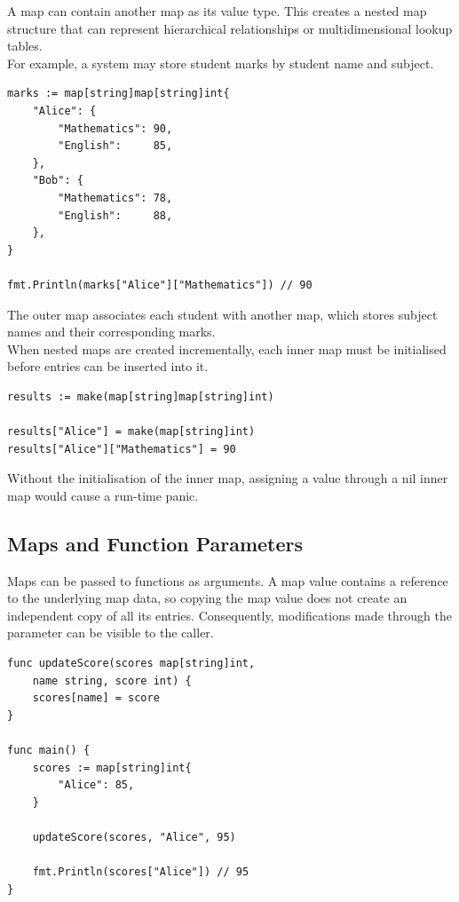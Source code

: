 A map can contain another map as its value type. This
creates a nested map structure that can represent
hierarchical relationships or multidimensional lookup
tables.\\

For example, a system may store student marks by student
name and subject.

\begin{lstlisting}
marks := map[string]map[string]int{
    "Alice": {
        "Mathematics": 90,
        "English":     85,
    },
    "Bob": {
        "Mathematics": 78,
        "English":     88,
    },
}

fmt.Println(marks["Alice"]["Mathematics"]) // 90
\end{lstlisting}

The outer map associates each student with another map,
which stores subject names and their corresponding marks.\\

When nested maps are created incrementally, each inner
map must be initialised before entries can be inserted
into it.

\begin{lstlisting}
results := make(map[string]map[string]int)

results["Alice"] = make(map[string]int)
results["Alice"]["Mathematics"] = 90
\end{lstlisting}

Without the initialisation of the inner map, assigning
a value through a nil inner map would cause a run-time
panic.

\subsection{Maps and Function Parameters}

Maps can be passed to functions as arguments. A map value
contains a reference to the underlying map data, so copying
the map value does not create an independent copy of all
its entries. Consequently, modifications made through
the parameter can be visible to the caller.

\begin{lstlisting}
func updateScore(scores map[string]int,
    name string, score int) {
    scores[name] = score
}

func main() {
    scores := map[string]int{
        "Alice": 85,
    }

    updateScore(scores, "Alice", 95)

    fmt.Println(scores["Alice"]) // 95
}
\end{lstlisting}

